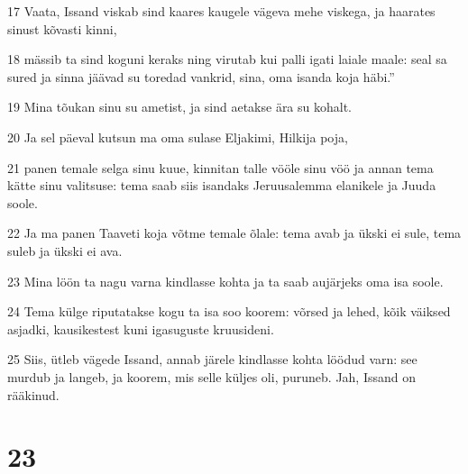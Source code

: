 \par 17 Vaata, Issand viskab sind kaares kaugele vägeva mehe viskega, ja haarates sinust kõvasti kinni,
\par 18 mässib ta sind koguni keraks ning virutab kui palli igati laiale maale: seal sa sured ja sinna jäävad su toredad vankrid, sina, oma isanda koja häbi.”
\par 19 Mina tõukan sinu su ametist, ja sind aetakse ära su kohalt.
\par 20 Ja sel päeval kutsun ma oma sulase Eljakimi, Hilkija poja,
\par 21 panen temale selga sinu kuue, kinnitan talle vööle sinu vöö ja annan tema kätte sinu valitsuse: tema saab siis isandaks Jeruusalemma elanikele ja Juuda soole.
\par 22 Ja ma panen Taaveti koja võtme temale õlale: tema avab ja ükski ei sule, tema suleb ja ükski ei ava.
\par 23 Mina löön ta nagu varna kindlasse kohta ja ta saab aujärjeks oma isa soole.
\par 24 Tema külge riputatakse kogu ta isa soo koorem: võrsed ja lehed, kõik väiksed asjadki, kausikestest kuni igasuguste kruusideni.
\par 25 Siis, ütleb vägede Issand, annab järele kindlasse kohta löödud varn: see murdub ja langeb, ja koorem, mis selle küljes oli, puruneb. Jah, Issand on rääkinud.

\chapter{23}

